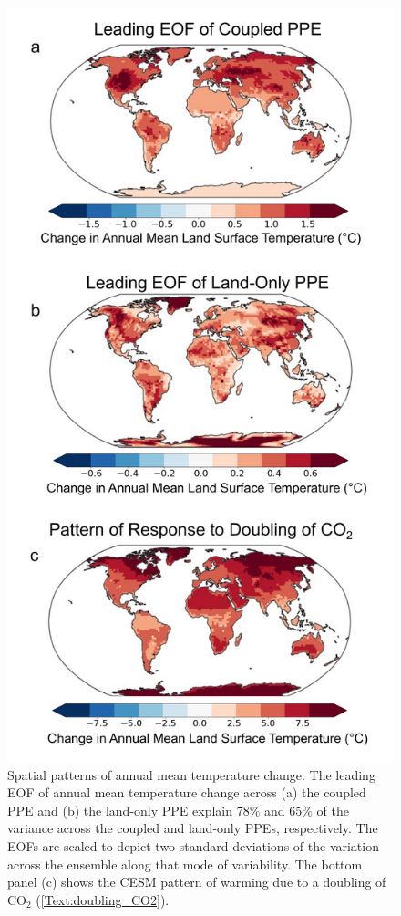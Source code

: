 \documentclass[draft]{agujournal2019}
\begin{document}
\begin{figure}
\centering
\noindent\includegraphics[height=\dimexpr\textheight-80pt\relax]{figs/Figure2.pdf}
\caption{Spatial patterns of annual mean temperature change. The leading EOF of annual mean temperature change across (a) the coupled PPE and (b) the land-only PPE explain 78$\%$ and 65$\%$ of the variance across the coupled and land-only PPEs, respectively. The EOFs are scaled to depict two standard deviations of the variation across the ensemble along that mode of variability. The bottom panel (c) shows the CESM pattern of warming due to a doubling of CO$_2$ (\ref{Text:doubling_CO2}).}
\label{fig:temperature_patterns}
\end{figure}
\end{document}
